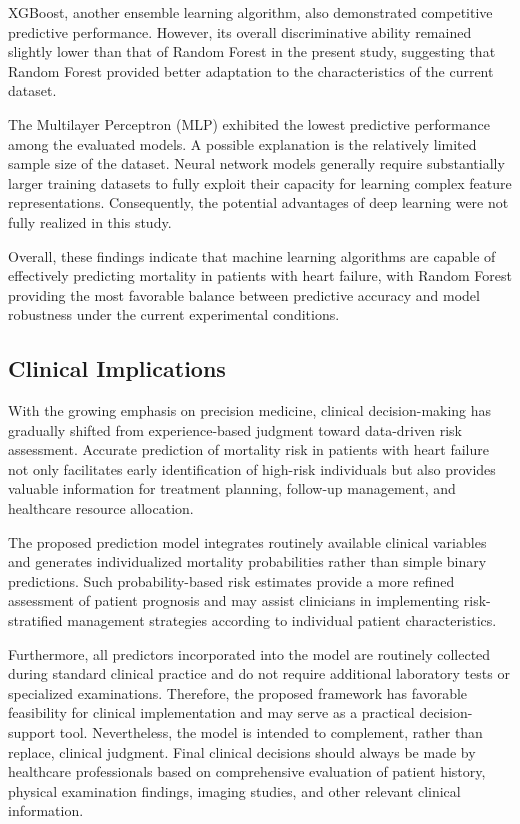 \documentclass[12pt]{article}
\begin{document}
XGBoost, another ensemble learning algorithm, also demonstrated competitive predictive performance. However, its overall discriminative ability remained slightly lower than that of Random Forest in the present study, suggesting that Random Forest provided better adaptation to the characteristics of the current dataset.\cite{Chen2016}

The Multilayer Perceptron (MLP) exhibited the lowest predictive performance among the evaluated models. A possible explanation is the relatively limited sample size of the dataset. Neural network models generally require substantially larger training datasets to fully exploit their capacity for learning complex feature representations. Consequently, the potential advantages of deep learning were not fully realized in this study.\cite{Esteva2019,Goodfellow2016}

Overall, these findings indicate that machine learning algorithms are capable of effectively predicting mortality in patients with heart failure, with Random Forest providing the most favorable balance between predictive accuracy and model robustness under the current experimental conditions. 

\subsection{Clinical Implications}

With the growing emphasis on precision medicine, clinical decision-making has gradually shifted from experience-based judgment toward data-driven risk assessment. Accurate prediction of mortality risk in patients with heart failure not only facilitates early identification of high-risk individuals but also provides valuable information for treatment planning, follow-up management, and healthcare resource allocation.

The proposed prediction model integrates routinely available clinical variables and generates individualized mortality probabilities rather than simple binary predictions. Such probability-based risk estimates provide a more refined assessment of patient prognosis and may assist clinicians in implementing risk-stratified management strategies according to individual patient characteristics.

Furthermore, all predictors incorporated into the model are routinely collected during standard clinical practice and do not require additional laboratory tests or specialized examinations. Therefore, the proposed framework has favorable feasibility for clinical implementation and may serve as a practical decision-support tool. Nevertheless, the model is intended to complement, rather than replace, clinical judgment. Final clinical decisions should always be made by healthcare professionals based on comprehensive evaluation of patient history, physical examination findings, imaging studies, and other relevant clinical information.
\end{document}
